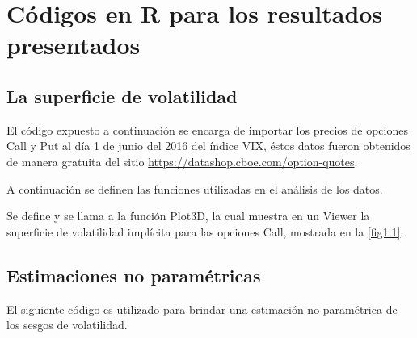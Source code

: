 \documentclass[letterpaper,12pt,oneside]{book}
\theoremstyle{plain}
\numberwithin{theorem}{section}
\begin{document}
\chapter{Códigos en R para los resultados presentados}
\section{La superficie de volatilidad}\label{anx:b1}
El código expuesto a continuación se encarga de importar los precios de opciones Call y Put al día 1 de junio del 2016 del índice VIX, éstos datos fueron obtenidos de manera gratuita del sitio \url{https://datashop.cboe.com/option-quotes}.

\newpage
A continuación se definen las funciones utilizadas en el análisis de los datos.

Se define y se llama a la función Plot3D, la cual muestra en un Viewer la superficie de volatilidad implícita para las opciones Call, mostrada en la \cref{fig1.1}.


\section{Estimaciones no paramétricas}
El siguiente código es utilizado para brindar una estimación no paramétrica de los sesgos de volatilidad.




\backmatter%
\end{document}
